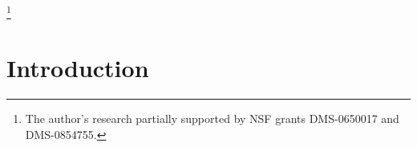 \documentclass[12pt,reqno]{amsart}
\begin{document}
\newcommand{\longhookrightarrow}{\lhook\joinrel\longrightarrow}
\newcommand{\longonto}{\relbar\joinrel\twoheadrightarrow}

\def\Case#1{\par\vspace{1\jot}\noindent
\stepcounter{CaseCount}
\framebox{Case \Alph{CaseCount}.\enspace#1}
\par\vspace{1\jot}\noindent\ignorespaces}

\title[\TITLERUNNING]{\TITLE}
\date{\DATE}

\author[Joseph H. Silverman]{Joseph H. Silverman}
\address{Mathematics Department, Box 1917
         Brown University, Providence, RI 02912 USA}
\thanks{The author's research partially supported by NSF grants DMS-0650017 and
DMS-0854755.}

\begin{abstract}
A number of authors have proven explicit versions of Lehmer's
conjecture for polynomials whose coefficients are all congruent to~$1$
modulo~$m$. We prove a similar result for polynomials~$f(X)$ that are
divisible in~$(\ZZ/m\ZZ)[X]$ by a polynomial of the form
$1+X+\cdots+X^n$ for some $n\ge\e \deg(f)$. We also formulate and
prove an analogous statement for elliptic curves.
\end{abstract}




\maketitle

\section*{Introduction}
\end{document}
